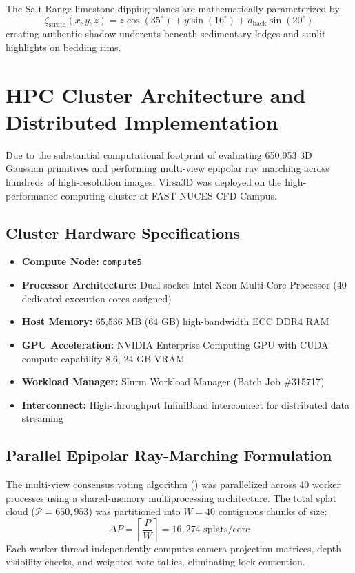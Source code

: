 \documentclass[11pt,a4paper]{article}
\begin{document}
The Salt Range limestone dipping planes are mathematically parameterized by:
\begin{equation}
    \zeta_{\text{strata}}(x, y, z) = z \cos(35^\circ) + y \sin(16^\circ) + d_{\text{back}} \sin(20^\circ)
    \label{eq:strata}
\end{equation}
creating authentic shadow undercuts beneath sedimentary ledges and sunlit highlights on bedding rims.
\section{HPC Cluster Architecture and Distributed Implementation}
\label{sec:hpc_cluster}

Due to the substantial computational footprint of evaluating 650,953 3D Gaussian primitives and performing multi-view epipolar ray marching across hundreds of high-resolution images, Virsa3D was deployed on the high-performance computing cluster at FAST-NUCES CFD Campus.

\subsection{Cluster Hardware Specifications}
\begin{itemize}
    \item \textbf{Compute Node:} \texttt{compute5}
    \item \textbf{Processor Architecture:} Dual-socket Intel Xeon Multi-Core Processor (40 dedicated execution cores assigned)
    \item \textbf{Host Memory:} 65,536 MB (64 GB) high-bandwidth ECC DDR4 RAM
    \item \textbf{GPU Acceleration:} NVIDIA Enterprise Computing GPU with CUDA compute capability 8.6, 24 GB VRAM
    \item \textbf{Workload Manager:} Slurm Workload Manager (Batch Job \#315717)
    \item \textbf{Interconnect:} High-throughput InfiniBand interconnect for distributed data streaming
\end{itemize}

\subsection{Parallel Epipolar Ray-Marching Formulation}
The multi-view consensus voting algorithm () was parallelized across 40 worker processes using a shared-memory multiprocessing architecture. The total splat cloud ($\mathcal{P} = 650,953$) was partitioned into $W = 40$ contiguous chunks of size:
\begin{equation}
    \Delta P = \left\lceil \frac{P}{W} \right\rceil = 16,274 \text{ splats/core}
    \label{eq:chunk_size}
\end{equation}
Each worker thread independently computes camera projection matrices, depth visibility checks, and weighted vote tallies, eliminating lock contention.
\end{document}
